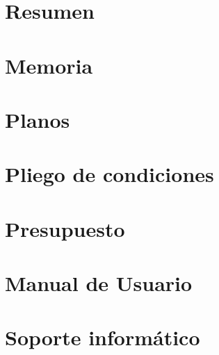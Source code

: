 %
%








\clearemptydoublepage




\clearemptydoublepage

\tableofcontents
\listoffigures
\listoftables
\setlength{\parskip}{2mm}

\newpage
\newpage

\clearemptydoublepage
\chapter{Resumen}
\newpage
\clearemptydoublepage

\clearemptydoublepage

\chapter{Memoria}
\newpage
\clearemptydoublepage

\clearemptydoublepage

\chapter{Planos}
\newpage
\clearemptydoublepage

\clearemptydoublepage

\chapter{Pliego de condiciones}
\newpage
\clearemptydoublepage

\clearemptydoublepage

\chapter{Presupuesto}
\newpage
\clearemptydoublepage

\clearemptydoublepage

\chapter{Manual de Usuario}
\newpage
\clearemptydoublepage

\clearemptydoublepage

\chapter{Soporte informático}
\newpage
\clearemptydoublepage

\clearemptydoublepage

